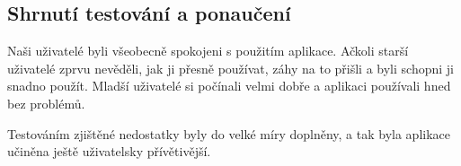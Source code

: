 \documentclass[a4paper, 11pt]{article}
\begin{document}

\subsection{Shrnutí testování a ponaučení}

Naši uživatelé byli všeobecně spokojeni s použitím aplikace. Ačkoli starší uživatelé zprvu nevěděli,
jak ji přesně používat, záhy na to přišli a byli schopni ji snadno použít. Mladší uživatelé
si počínali velmi dobře a aplikaci používali hned bez problémů.

Testováním zjištěné nedostatky byly do velké míry doplněny, a tak byla aplikace učiněna
ještě uživatelsky přívětivější.
\end{document}
